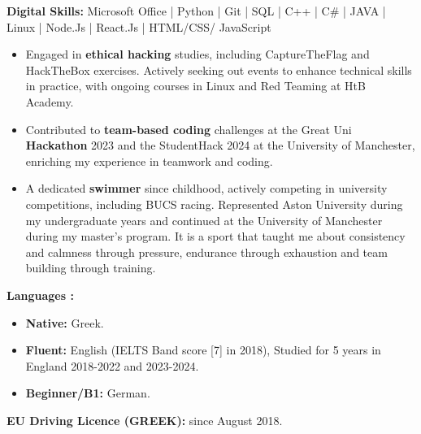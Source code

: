 \textbf{Digital Skills:}
Microsoft Office | Python | Git | SQL | C++ | C\# | JAVA | Linux | Node.Js | React.Js | HTML/CSS/
JavaScript

\vspace{10pt}

\begin{itemize}

      \item Engaged in \textbf{ethical hacking} studies, including CaptureTheFlag and HackTheBox exercises. Actively seeking out events to enhance technical skills in practice, with ongoing courses in Linux and Red Teaming at HtB Academy.
      \item Contributed to \textbf{team-based coding} challenges at the Great Uni \textbf{Hackathon} 2023 and the StudentHack 2024 at the University of Manchester, enriching my experience in teamwork and coding.
      \item A dedicated \textbf{swimmer} since childhood, actively competing in university competitions, including BUCS racing. Represented Aston University during my undergraduate years and continued at the University of Manchester during my master's program. It is a sport that taught me about consistency and calmness through pressure, endurance through exhaustion and team building through training.

\end{itemize}

\vspace{10pt}

\textbf{Languages :}
\begin{itemize}
      \item \textbf{Native:} Greek.
      \item \textbf{Fluent:} English (IELTS Band score [7] in 2018), Studied for 5 years in England 2018-2022 and 2023-2024.
      \item \textbf{Beginner/B1:} German.
\end{itemize}

\vspace{10pt}

\textbf{EU Driving Licence (GREEK):} since August 2018.